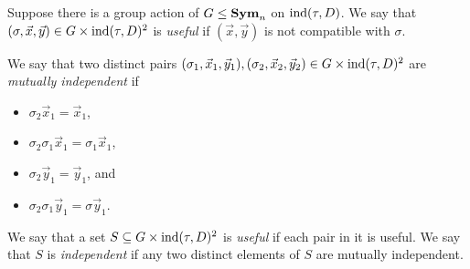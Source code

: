 \documentclass[../paper.tex]{subfiles}
\begin{document}
\begin{definition}
  Suppose there is a group action of $G \leq \text{\textbf{Sym}}_n$ on $\text{\upshape ind}(\tau, D)$. We say
  that $(\sigma, \vec{x}, \vec{y}) \in G \times \text{\upshape ind}(\tau, D)^{2}$ is
  \emph{useful} if $(\vec{x}, \vec{y})$ is not compatible with $\sigma$.

  We say that two distinct pairs $(\sigma_1, \vec{x}_1, \vec{y}_1), (\sigma_2,
  \vec{x}_2, \vec{y}_2) \in G\times \text{\upshape ind}(\tau, D)^2$ are \emph{mutually
    independent} if
  \begin{itemize}
    \setlength\itemsep{0mm}
  \item $\sigma_2 \vec{x}_1 = \vec{x}_1$,
  \item $\sigma_2 \sigma_1 \vec{x}_1 = \sigma_1 \vec{x}_1$,
  \item $\sigma_2 \vec{y}_1 = \vec{y}_1$, and
  \item $\sigma_2 \sigma_1 \vec{y}_1 = \sigma \vec{y}_1$.
  \end{itemize}
  
  We say that a set $S \subseteq G \times \text{\upshape ind}(\tau, D)^2$ is \emph{useful} if
  each pair in it is useful. We say that $S$ is \emph{independent} if any two
  distinct elements of $S$ are mutually independent.
\end{definition}


  
\end{document}
